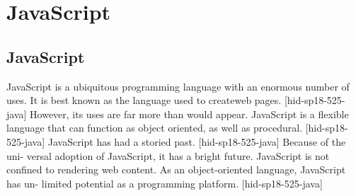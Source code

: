\section{JavaScript}


\subsection{JavaScript}

JavaScript is a ubiquitous programming language with an
enormous number of uses. It is best known as the language
used to createweb pages. [hid-sp18-525-java] However, its 
uses are far more than would appear. JavaScript is a flexible 
language that can function as object oriented, as well as 
procedural. [hid-sp18-525-java] JavaScript has had a storied 
past. [hid-sp18-525-java] Because of the uni- versal adoption 
of JavaScript, it has a bright future. JavaScript is not 
confined to rendering web content. As an object-oriented 
language, JavaScript has un- limited potential as a 
programming platform. [hid-sp18-525-java]
